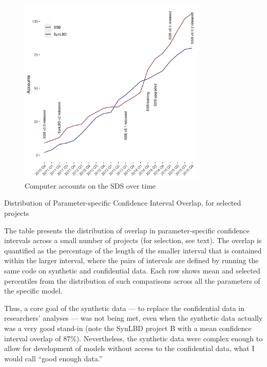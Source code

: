 \documentclass[]{hdsr}
\begin{document}
\begin{figure}
    \centering
    \includegraphics[width=0.8\textwidth]{figs/accounts-2015.png}
    \caption{Computer accounts on the SDS over time}
    \label{fig:growth_in_sds}
\end{figure}

\begin{table}[]
    \centering
    \begin{threeparttable}
        
        \caption{Distribution of Parameter-specific Confidence Interval Overlap, for selected projects}
        \label{tab:overlap}
        \begin{tablenotes}
            \footnotesize
            \item[] The table presents the distribution of overlap in parameter-specific confidence intervals \citep{tas2006} across a small number of projects (for selection, see text). The overlap is quantified as the percentage of the length of the smaller interval that is contained within the larger interval, where the pairs of intervals are defined by running the same code on synthetic and confidential data. Each row shows mean and selected percentiles from the distribution of such comparisons across all the parameters of the specific model. 
        \end{tablenotes}
    \end{threeparttable}
\end{table}
Thus, a core goal of the synthetic data --- to replace the confidential data in researchers' analyses --- was not being met, even when the synthetic data actually was a very good stand-in (note the SynLBD project B with a mean confidence interval overlap of 87\%). Nevertheless, the synthetic data were complex enough to allow for development of models without access to the confidential data, what I would call ``good enough data.''
\end{document}
